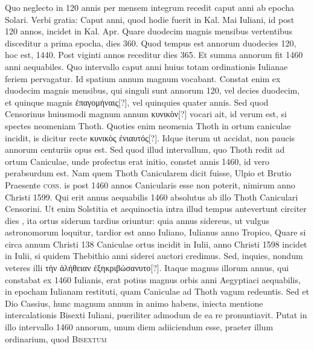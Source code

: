 %
Quo neglecto in
120 annis per mensem integrum recedit caput anni ab epocha Solari.
Verbi gratia: Caput anni, quod hodie fuerit in Kal. Mai Iuliani, id
post 120 annos, incidet in Kal. Apr.
Quare duodecim magnis mensibus
vertentibus disceditur a prima epocha, dies 360.
Quod tempus
est annorum duodecies 120, hoc est, 1440.
Post viginti annos receditur
dies 365.
Et summa annorum fit 1460 anni aequabiles.
Quo
intervallo caput anni huius totam ordinationis Iulianae feriem pervagatur.
Id spatium annum magnum vocabant.
Constat enim ex duodecim
magnis mensibus, qui singuli sunt annorum 120, vel decies duodecim,
et quinque magnis \textgreek{ἐπαγομήναις}[?], vel quinquies quater annis.
Sed quod Censorinus huiusmodi magnum annum \textgreek{κυνικὸν}[?]
 vocari ait,
id verum est, si spectes neomeniam Thoth.
Quoties enim neomenia
Thoth in ortum caniculae incidit, is dicitur recte
 \textgreek{κυνικὸς ἐνιαυτός}[?].
Idque iterum ut accidat, non paucis annorum centuriis opus est.
Sed quod illud intervallum, quo Thoth redit ad ortum Caniculae,
unde profectus erat initio, constet annis 1460, id vero perabsurdum
est.
Nam quem Thoth Canicularem dicit fuisse, Ulpio et
Brutio Praesente \textsc{coss.} is post 1460 annos Canicularis esse non
poterit, nimirum anno Christi 1599.
Qui erit annus aequabilis 1460
absolutus ab illo Thoth Caniculari Censorini.
Ut enim Solstitia et
aequinoctia intra illud tempus antevertunt circiter dies , ita ortus
siderum tardius oriuntur: quia annus sidereus,
 ut vulgus astronomorum
loquitur, tardior est anno Iuliano, Iulianus anno Tropico,
Quare
si circa annum Christi 138 Caniculae ortus incidit in  Iulii, anno
Christi 1598 incidet in  Iulii, si quidem Thebithio anni siderei
auctori credimus.
Sed, inquies, nondum veteres illi \textgreek{τὴν ἀλήθειαν
ἐξηκριβώσανυτο}[?].
Itaque magnus illorum annus, qui constabat ex 1460
Iulianis, erat potius magnus orbis anni Aegyptiaci aequabilis, in epocham
Iulianam restituti, quam Caniculae ad Thoth vagum redeuntis.
Sed et Dio Cassius, hunc magnum annum in animo habens,
iniecta mentione intercalationis Bisexti Iuliani, pueriliter admodum
de ea re pronuntiavit.
Putat in illo intervallo 1460 annorum,
unum diem adiiciendum esse, praeter illum ordinarium, quod \textsc{Bisextum}
